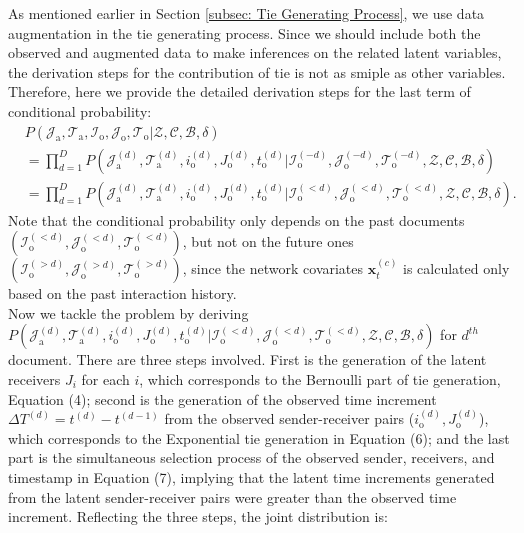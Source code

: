 \documentclass[a4paper]{article}
\begin{document}
  As mentioned earlier in Section \ref{subsec: Tie Generating Process}, we use data augmentation in the tie generating process. Since we should include both the observed and augmented data to make inferences on the related latent variables, the derivation steps for the contribution of tie is not as smiple as other variables. Therefore, here we provide the detailed derivation steps for the last term of conditional probability: 
 \begin{equation}
\begin{aligned}
&P(\mathcal{J}_{\mbox{a}}, \mathcal{T}_{\mbox{a}},\mathcal{I}_{\mbox{o}}, \mathcal{J}_{\mbox{o}}, \mathcal{T}_{\mbox{o}} |\mathcal{Z}, \mathcal{C}, \mathcal{B}, \delta)
\\& = \prod_{d=1}^D P(\mathcal{J}^{(d)}_{\mbox{a}}, \mathcal{T}^{(d)}_{\mbox{a}}, i^{(d)}_{\mbox{o}}, J^{(d)}_{\mbox{o}}, t^{(d)}_{\mbox{o}} |\mathcal{I}^{(-d)}_{\mbox{o}}, \mathcal{J}^{(-d)}_{\mbox{o}}, \mathcal{T}^{(-d)}_{\mbox{o}},\mathcal{Z}, \mathcal{C}, \mathcal{B}, \delta)
\\& = \prod_{d=1}^D P(\mathcal{J}^{(d)}_{\mbox{a}}, \mathcal{T}^{(d)}_{\mbox{a}}, i^{(d)}_{\mbox{o}}, J^{(d)}_{\mbox{o}}, t^{(d)}_{\mbox{o}} |\mathcal{I}^{(<d)}_{\mbox{o}}, \mathcal{J}^{(<d)}_{\mbox{o}}, \mathcal{T}^{(<d)}_{\mbox{o}},\mathcal{Z}, \mathcal{C}, \mathcal{B}, \delta).
\end{aligned}
 \end{equation}
 Note that the conditional probability only depends on the past documents $(\mathcal{I}^{(<d)}_{\mbox{o}}, \mathcal{J}^{(<d)}_{\mbox{o}}, \mathcal{T}^{(<d)}_{\mbox{o}})$, but not on the future ones $(\mathcal{I}^{(>d)}_{\mbox{o}}, \mathcal{J}^{(>d)}_{\mbox{o}}, \mathcal{T}^{(>d)}_{\mbox{o}})$, since the network covariates $\boldsymbol{x}_t^{(c)}$ is calculated only based on the past interaction history. \\ \newline
Now we tackle the problem by deriving $P(\mathcal{J}^{(d)}_{\mbox{a}}, \mathcal{T}^{(d)}_{\mbox{a}}, i^{(d)}_{\mbox{o}}, J^{(d)}_{\mbox{o}}, t^{(d)}_{\mbox{o}} |\mathcal{I}^{(<d)}_{\mbox{o}}, \mathcal{J}^{(<d)}_{\mbox{o}}, \mathcal{T}^{(<d)}_{\mbox{o}}, \mathcal{Z}, \mathcal{C}, \mathcal{B}, \delta)$ for $d^{th}$ document. There are three steps involved. First is the generation of the latent receivers $J_i$ for each $i$, which corresponds to the Bernoulli part of tie generation, Equation (4); second is the generation of the observed time increment $\Delta T^{(d)} = t^{(d)} - t^{(d-1)}$ from the observed sender-receiver pairs ($i^{(d)}_{\mbox{o}}, J^{(d)}_{\mbox{o}}$), which corresponds to the Exponential tie generation in Equation (6); and the last part is the simultaneous selection process of the observed sender, receivers, and timestamp in Equation (7), implying that the latent time increments generated from the latent sender-receiver pairs were greater than the observed time increment. Reflecting the three steps, the joint distribution is:\\
\end{document}
